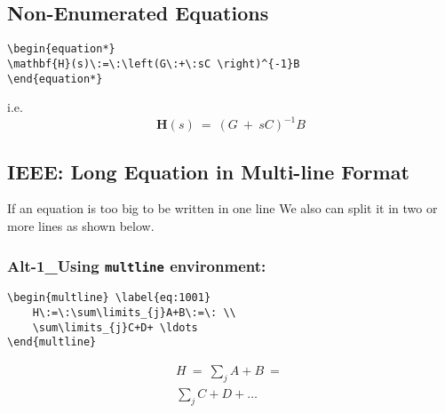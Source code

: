 \subsection{Non-Enumerated Equations}
%
\begin{verbatim}
\begin{equation*}  
\mathbf{H}(s)\:=\:\left(G\:+\:sC \right)^{-1}B
\end{equation*}
\end{verbatim}
%
i.e. 
%
\begin{equation*}  
	\mathbf{H}(s)\:=\:\left(G\:+\:sC \right)^{-1}B
\end{equation*}
%
%
\subsection{IEEE: Long Equation in Multi-line Format}
If an equation is too big to be written in one line We also can split it in two or more lines as shown below. 
%
%
\subsubsection{Alt-1\_Using \texttt{multline} environment:}
%
%
\begin{verbatim}
\begin{multline} \label{eq:1001}
	H\:=\:\sum\limits_{j}A+B\:=\: \\
	\sum\limits_{j}C+D+ \ldots
\end{multline}
\end{verbatim}
%
%
\begin{center}
\begin{minipage}{0,4\textwidth}
\begin{multline} \label{eq:1001}
	H\:=\:\sum\limits_{j}A+B\:=\: \\
	\sum\limits_{j}C+D+ \ldots
\end{multline}
\end{minipage}
\end{center}
%
%
